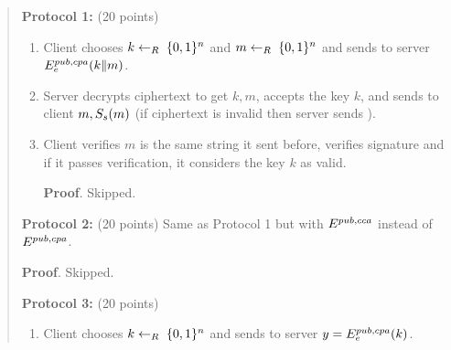 \documentclass{article}
\begin{document}
\begin{quote}%

\noindent{}\textbf{Protocol 1:} (20 points)%

\begin{enumerate}%

\item{}
Client chooses $k \leftarrow_R\; \{0,1\}^n$ and $m \leftarrow_R\; \{0,1\}^n$ and sends to server $E^{pub,cpa}_e(k \| m)$.%

\item{}
Server decrypts ciphertext to get $k,m$, accepts the key $k$, and sends to client $m,S_s(m)$ (if
ciphertext is invalid then server sends ).%

\item{}
Client verifies $m$ is the same string it sent before, verifies signature and if it passes verification, it
considers the key $k$ as valid.%

\begin{mdbmarginx}{1ex}{0pt}{1ex}{0pt}%
\noindent{}\textbf{Proof}.  Skipped.%
\end{mdbmarginx}%
\end{enumerate}%

\noindent{}\textbf{Protocol 2:} (20 points) Same as Protocol 1 but with $E^{pub,cca}$ instead of $E^{pub,cpa}$.%

\begin{mdbmarginx}{1ex}{0pt}{1ex}{0pt}%
\noindent{}\textbf{Proof}.  Skipped.%
\end{mdbmarginx}%

\noindent{}\textbf{Protocol 3:} (20 points)%

\begin{enumerate}%

\item{}
Client chooses $k \leftarrow_R\; \{0,1\}^n$ and sends to server $y=E^{pub,cpa}_e(k)$.%


\end{enumerate}
\end{quote}
\end{document}
